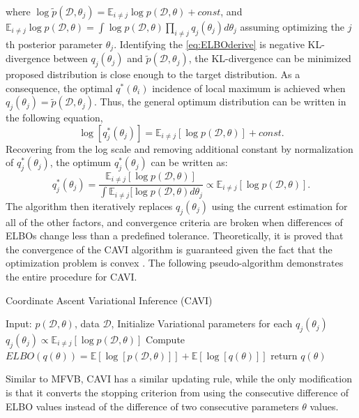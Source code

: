 \noindent 
where $\log \tilde{p}(\mathcal{D},\theta_j) = \mathbb{E}_{i \neq j}\log p(\mathcal{D},\theta) + const$, and $\mathbb{E}_{i\neq j}\log p(\mathcal{D},\theta)  = \int \log p(\mathcal{D},\theta)\prod_{i\neq j}q_j(\theta_j)d\theta_j$ assuming optimizing the $j$th posterior parameter $\theta_j$.
Identifying the \autoref{eq:ELBOderive} is negative KL-divergence between $q_j(\theta_j) $ and $\tilde{p}(\mathcal{D},\theta_j)$, the KL-divergence can be minimized proposed distribution is close enough to the target distribution. As a consequence, the optimal $q^{*}(\theta_i)$ incidence of local maximum is achieved when $q_j(\theta_j) = \tilde{p}(\mathcal{D},\theta_j)$. Thus, the general optimum distribution can be written in the following equation,
\begin{equation}
	\label{eq:logoptimumQ}
	\log[q_j^*(\theta_j)] = \mathbb{E}_{i\neq j}[\log p(\mathcal{D},\theta)] + const.
\end{equation}
Recovering from the log scale and removing additional constant by normalization of $q_j^*(\theta_j)$, the optimum $q_j^*(\theta_j)$ can be written as:
\begin{equation}
	\label{eq:optimalSolution}
	q_j^*(\theta_j) = \frac{\mathbb{E}_{i\neq j}[\log p(\mathcal{D},\theta)]}{\int \mathbb{E}_{i\neq j}[\log p(\mathcal{D},\theta)d\theta_j} \propto \mathbb{E}_{i\neq j}[\log p(\mathcal{D},\theta)].
\end{equation}
The algorithm then iteratively replaces $q_j(\theta_j)$ using the current estimation for all of the other factors, and convergence criteria are broken when differences of ELBOs change less than a predefined tolerance. Theoretically, it is proved that the convergence of the CAVI algorithm is guaranteed given the fact that the optimization problem is convex \cite{boyd2004convex}. The following pseudo-algorithm demonstrates the entire procedure for CAVI.
\begin{algorithm}
	\caption{Coordinate Ascent Variational Inference (CAVI)}
	\begin{algorithmic}[1]
		
		\State Input: $p(\mathcal{D},\theta)$, data $\mathcal{D}$, Initialize Variational parameters for each $q_j(\theta_j)$
		\State $q_j(\theta_j) \propto \mathbb{E}_{i\neq j}[\log p(\mathcal{D},\theta)]$
		\EndFor
		\State Compute $ELBO(q(\theta)) = \mathbb{E}[\log[p(\mathcal{D},\theta)]] + \mathbb{E}[\log[q(\theta)]]$
		\EndWhile 
		\State return $q(\theta)$
	\end{algorithmic}
\end{algorithm}
Similar to MFVB, CAVI has a similar updating rule, while the only modification is that it converts the stopping criterion from using the consecutive difference of ELBO values instead of the difference of two consecutive parameters $\theta$ values.

